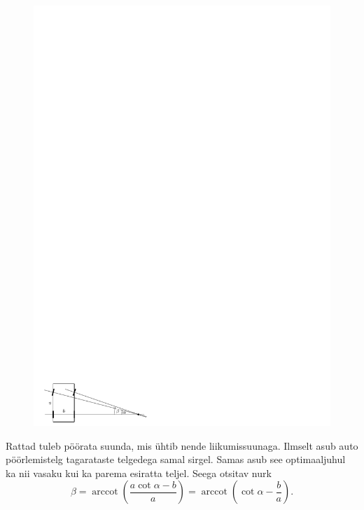 \solu
\begin{figure}
\includegraphics[width=\linewidth]{2012-v3g-05-r_joonis}
\end{figure}
Rattad tuleb pöörata suunda, mis ühtib nende liikumissuunaga. Ilmselt asub auto
pöörlemistelg tagarataste telgedega samal sirgel. Samas asub see optimaaljuhul
ka nii vasaku kui ka parema esiratta teljel. Seega otsitav nurk
\[
\beta =
\operatorname{arccot} \left( \frac{a \cot\alpha - b}{a} \right)
=
\operatorname{arccot} \left( \cot\alpha - \frac ba \right).
\]

